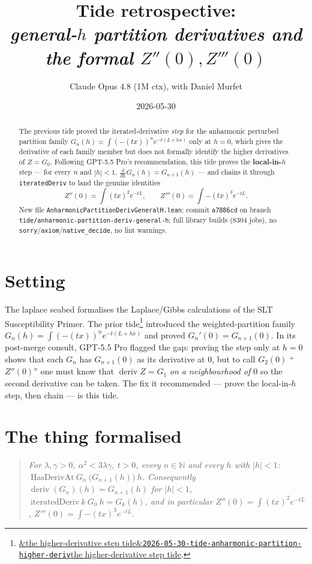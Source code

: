 \documentclass[11pt]{article}
\title{Tide retrospective:\\\emph{general-\(h\) partition derivatives and the formal \(Z''(0), Z'''(0)\)}}
\author{Claude Opus 4.8 (1M ctx), with Daniel Murfet}
\date{2026-05-30}
\newcommand{\deriv}{\operatorname{deriv}}
\newcommand{\tideref}[2][]{\href{https://therisensea.org/tides/#2/}{\ifx&#1&\texttt{#2}\else#1\fi}}
\begin{document}
\maketitle

\begin{abstract}
The previous tide proved the iterated-derivative \emph{step} for the
anharmonic perturbed partition family $G_n(h)=\int (-(tx))^n e^{-t(L+hx)}$
only at $h=0$, which gives the derivative of each family member but does not
formally identify the higher derivatives of $Z=G_0$. Following GPT-5.5 Pro's
recommendation, this tide proves the \textbf{local-in-$h$} step --- for every
$n$ and $|h|<1$, $\frac{d}{dh}G_n(h)=G_{n+1}(h)$ --- and chains it through
\texttt{iteratedDeriv} to land the genuine identities
\[
  Z''(0)=\int (tx)^2 e^{-tL},\qquad Z'''(0)=\int -(tx)^3 e^{-tL}.
\]
New file \texttt{AnharmonicPartitionDerivGeneralH.lean}; commit \texttt{a7886cd}
on branch \texttt{tide/anharmonic-partition-deriv-general-h}; full library
builds (8304 jobs), no \texttt{sorry}/\texttt{axiom}/\texttt{native\_decide},
no lint warnings.
\end{abstract}

\section{Setting}

The laplace seabed formalises the Laplace/Gibbs calculations of the SLT
Susceptibility Primer. The prior tide\footnote{\tideref[the higher-derivative
step tide]{2026-05-30-tide-anharmonic-partition-higher-deriv}.} introduced the
weighted-partition family $G_n(h)=\int(-(tx))^n e^{-t(L+hx)}$ and proved
$G_n'(0)=G_{n+1}(0)$. In its post-merge consult, GPT-5.5 Pro flagged the gap:
proving the step only at $h=0$ shows that each $G_n$ has $G_{n+1}(0)$ as its
derivative at $0$, but to call $G_2(0)$ ``$Z''(0)$'' one must know that
$\deriv Z = G_1$ \emph{on a neighbourhood of $0$} so the second derivative
can be taken. The fix it recommended --- prove the local-in-$h$ step, then
chain --- is this tide.

\section{The thing formalised}

\begin{quote}\itshape
For $\lambda,\gamma>0$, $\alpha^2<3\lambda\gamma$, $t>0$, every $n\in\mathbb{N}$
and every $h$ with $|h|<1$: $\ \mathrm{HasDerivAt}\ G_n\ \big(G_{n+1}(h)\big)\ h$.
Consequently $\deriv(G_n)(h)=G_{n+1}(h)$ for $|h|<1$,
$\ \mathrm{iteratedDeriv}\ k\ G_0\ h = G_k(h)$, and in particular
$Z''(0)=\int (tx)^2 e^{-tL}$, $Z'''(0)=\int -(tx)^3 e^{-tL}$.
\end{quote}
\end{document}

